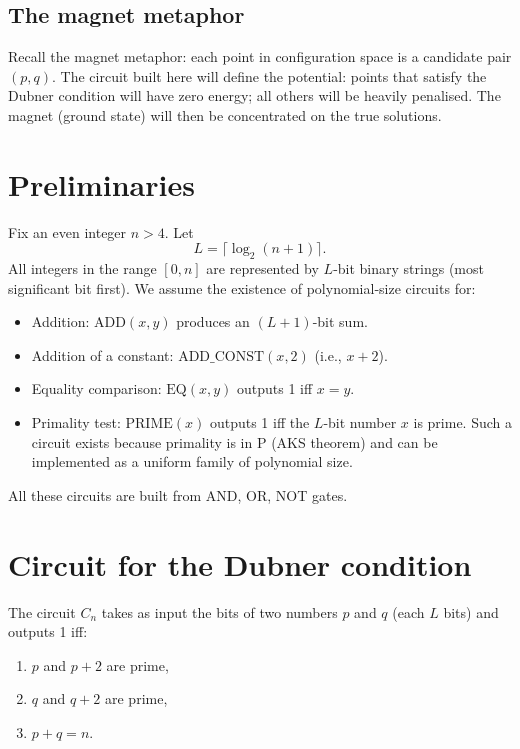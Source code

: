 \documentclass[11pt,a4paper]{article}
\begin{document}
\subsection{The magnet metaphor}

Recall the magnet metaphor: each point in configuration space is a candidate pair \((p,q)\). The circuit built here will define the potential: points that satisfy the Dubner condition will have zero energy; all others will be heavily penalised. The magnet (ground state) will then be concentrated on the true solutions.

\section{Preliminaries}

Fix an even integer \(n > 4\). Let
\[
L = \lceil \log_2 (n+1) \rceil.
\]
All integers in the range \([0,n]\) are represented by \(L\)-bit binary strings (most significant bit first). We assume the existence of polynomial‑size circuits for:
\begin{itemize}
\item Addition: \(\mathrm{ADD}(x,y)\) produces an \((L+1)\)-bit sum.
\item Addition of a constant: \(\mathrm{ADD\_CONST}(x,2)\) (i.e., \(x+2\)).
\item Equality comparison: \(\mathrm{EQ}(x,y)\) outputs 1 iff \(x = y\).
\item Primality test: \(\mathrm{PRIME}(x)\) outputs 1 iff the \(L\)-bit number \(x\) is prime. Such a circuit exists because primality is in P (AKS theorem) and can be implemented as a uniform family of polynomial size.
\end{itemize}
All these circuits are built from AND, OR, NOT gates.

\section{Circuit for the Dubner condition}

The circuit \(C_n\) takes as input the bits of two numbers \(p\) and \(q\) (each \(L\) bits) and outputs 1 iff:
\begin{enumerate}
\item \(p\) and \(p+2\) are prime,
\item \(q\) and \(q+2\) are prime,
\item \(p+q = n\).
\end{enumerate}
\end{document}
